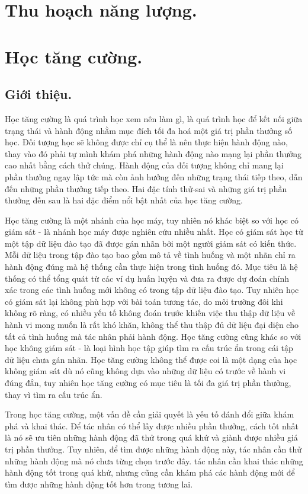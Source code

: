 \documentclass{uetgraduation}
\begin{document}
\section{Thu hoạch năng lượng.}


\section{Học tăng cường.}
\subsection{Giới thiệu.}
Học tăng cường là quá trình học xem nên làm gì, là quá trình học để kết nối giữa trạng thái và hành động nhằm mục đích tối đa hoá một giá trị phần thưởng số học. Đối tượng học sẽ không được chỉ cụ thể là
nên thực hiện hành động nào, thay vào đó phải tự mình khám phá những hành động nào mạng lại phần thưởng cao nhất bằng cách thử chúng. Hành động của đối tượng không chỉ mang lại phần thưởng ngay lập tức mà còn ảnh hưởng
đến những trạng thái tiếp theo, dẫn đến những phần thưởng tiếp theo. Hai đặc tính thử-sai và những giá trị phần thưởng đến sau là hai đặc điểm nổi bật nhất của học tăng cường.

Học tăng cường là một nhánh của học máy, tuy nhiên nó khác biệt so với học có giám sát - là nhánh học máy được nghiên cứu nhiều nhất. Học có giám sát học từ một tập dữ liệu đào tạo đã được gán nhãn
bởi một người giám sát có kiến thức. Mỗi dữ liệu trong tập đào tạo bao gồm mô tả về tình huống và một nhãn chỉ ra hành động đúng mà hệ thống cần thực hiện trong tình huống đó. Mục tiêu là hệ thống
có thể tổng quát từ các ví dụ huấn luyện và đưa ra được dự đoán chính xác trong các tình huống mới không có trong tập dữ liệu đào tạo. Tuy nhiên học có giám sát lại không phù hợp với bài toán tương
tác, do môi trường đôi khi không rõ ràng, có nhiều yếu tố không đoán trước khiến việc thu thập dữ liệu về hành vi mong muốn là rất khó khăn, không thể thu thập đủ dữ liệu đại diện cho tất cả tình huống
mà tác nhân phải hành động. Học tăng cường cũng khác so với học không giám sát - là loại hình học tập giúp tìm ra cấu trúc ẩn trong cái tập dữ liệu chưa gán nhãn. Học tăng cường không thể được coi là
một dạng của học không giám sát dù nó cũng không dựa vào những dữ liệu có trước về hành vi đúng đắn, tuy nhiên học tăng cường có mục tiêu là tối đa giá trị phần thưởng, thay vì tìm ra cấu trúc ẩn.

Trong học tăng cường, một vấn đề cần giải quyết là yếu tố đánh đổi giữa khám phá và khai thác. Để tác nhân có thể lấy được nhiều phần thưởng, cách tốt nhất là nó sẽ ưu tiên những hành động đã thử trong
quá khứ và giành được nhiều giá trị phần thưởng. Tuy nhiên, để tìm được những hành động này, tác nhân cần thử những hành động mà nó chưa từng chọn trước đây. tác nhân cần khai thác những hành động tốt trong
quá khứ, nhưng cũng cần khám phá các hành động mới để tìm được những hành động tốt hơn trong tương lai.
\end{document}
